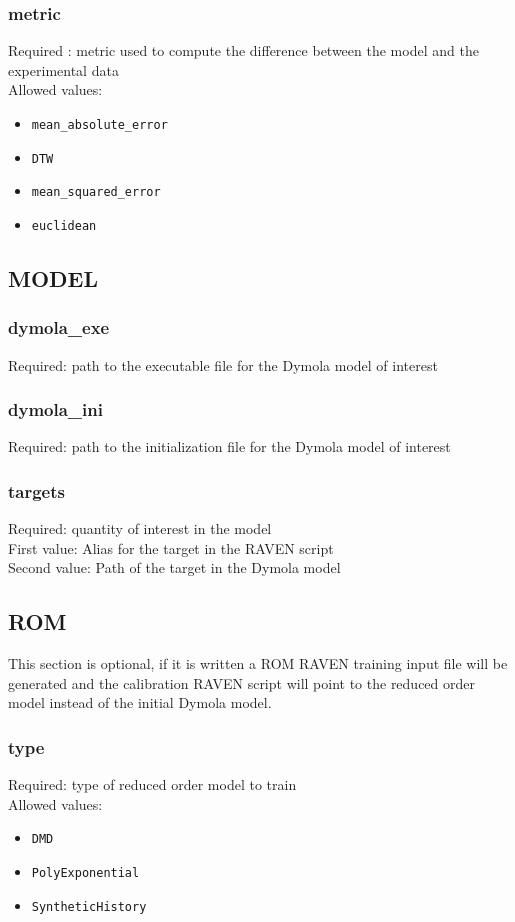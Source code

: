\documentclass[oneside]{book}
\begin{document}
\subsubsection{metric} Required : metric used to compute the difference between the model and the experimental data
\\Allowed values: 
\begin{itemize}
    \item \verb|mean_absolute_error|
    \item \verb|DTW|
    \item \verb|mean_squared_error|
    \item \verb|euclidean|
\end{itemize}


\subsection{MODEL}

\subsubsection{dymola\_exe} Required: path to the executable file for the Dymola model of interest

\subsubsection{dymola\_ini} Required: path to the initialization file for the Dymola model of interest

\subsubsection{targets} Required: quantity of interest in the model
\\First value: Alias for the target in the RAVEN script
\\Second value: Path of the target in the Dymola model

\subsection{ROM}

This section is optional, if it is written a ROM RAVEN training input file will be generated and the calibration RAVEN script will point to the reduced order model instead of the initial Dymola model.  

\subsubsection{type} Required: type of reduced order model to train
\\Allowed values:
\begin{itemize}
    \item \verb|DMD|
    \item \verb|PolyExponential|
    \item \verb|SyntheticHistory|
\end{itemize}
\end{document}
